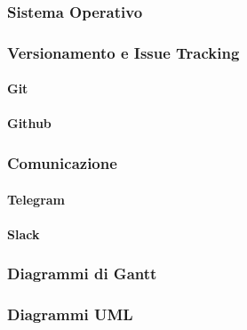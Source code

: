 \subsubsection{Sistema Operativo}


\subsubsection{Versionamento e Issue Tracking}

\paragraph{Git}

\paragraph{Github}


\subsubsection{Comunicazione}

\paragraph{Telegram}

\paragraph{Slack}


\subsubsection{Diagrammi di Gantt}


\subsubsection{Diagrammi UML}